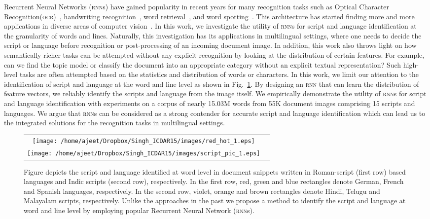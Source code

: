 Recurrent Neural Networks (\textsc{rnn}s) have gained popularity in recent years for many recognition tasks such as Optical Character Recognition(\textsc{ocr})~\cite{Breuel13,PraveenDAS}, handwriting recognition{~\cite{GravesLFBBS09}}, word retrieval{~\cite{Volkmar11}}, and word spotting~\cite{Manmatha12}. This architecture has started finding more and more applications in diverse areas of computer vision~\cite{Hinton12}. In this work, we investigate the utility of \textsc{rnn}s for script and language identification at the granularity of words
and lines. Naturally, this investigation has its applications in multilingual settings, where one 
needs to decide the script or language before recognition or post-processing of an incoming document image. In addition, this work also throws light on how semantically richer tasks can be attempted without any explicit recognition by looking at the distribution of certain features. For example, can we find the topic model or classify the document into an appropriate category without an explicit textual representation? Such high-level tasks are often attempted based on the statistics and distribution of words or characters. In this work, we limit our attention to the identification of script and language at the word and line level as shown in Fig.~\ref{fig:demoResults}. By designing an \textsc{rnn} that can learn the distribution of feature vectors, we reliably identify the scripts and language from the image itself. We empirically demonstrate the utility of \textsc{rnn}s for script and language identification with experiments on a corpus of nearly 15.03M words from 55K document images comprising 15 scripts and languages. We argue that \textsc{rnn}s can be considered as a strong contender for accurate script and language identification which can lead us to the integrated solutions for the recognition tasks in multilingual settings.

\begin{figure}[t]
\begin{center}
\tabcolsep=0.20cm
\def\arraystretch{0.5}
\begin{tabular}{cc}
{\texttt{[image: /home/ajeet/Dropbox/Singh\_ICDAR15/images/red\_hot\_1.eps]}} \\
{\texttt{[image: /home/ajeet/Dropbox/Singh\_ICDAR15/images/script\_pic\_1.eps]}}
\\
\end{tabular}
\end{center}
\caption{Figure depicts the script and language identified at word level in document snippets written in Roman-script (first row) based languages and Indic scripts (second row), respectively. In the first row, red, green and blue rectangles denote German, French and Spanish languages, respectively. In the second row, violet, orange and brown rectangles denote Hindi, Telugu and Malayalam scripts, respectively. Unlike the approaches in the past we propose a method to identify the script and language at word and line level by employing popular Recurrent Neural Network (\textsc{rnn}s).}
\label{fig:demoResults}
\end{figure}

